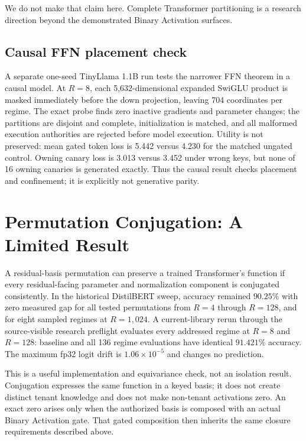 \documentclass[11pt]{article}
\begin{document}
We do not make that claim here. Complete Transformer partitioning is a research
direction beyond the demonstrated Binary Activation surfaces.

\subsection{Causal FFN placement check}

A separate one-seed TinyLlama 1.1B run tests the narrower FFN theorem in a
causal model. At $R=8$, each 5,632-dimensional expanded SwiGLU product is
masked immediately before the down projection, leaving 704 coordinates per
regime. The exact probe finds zero inactive gradients and parameter changes;
the partitions are disjoint and complete, initialization is matched, and all
malformed execution authorities are rejected before model execution. Utility is
not preserved: mean gated token loss is 5.442 versus 4.230 for the matched
ungated control. Owning canary loss is 3.013 versus 3.452 under wrong keys, but
none of 16 owning canaries is generated exactly. Thus the causal result checks
placement and confinement; it is explicitly not generative parity.

\section{Permutation Conjugation: A Limited Result}

A residual-basis permutation can preserve a trained Transformer's function if
every residual-facing parameter and normalization component is conjugated
consistently. In the historical DistilBERT sweep, accuracy remained $90.25\%$
with zero measured gap for all tested permutations from $R=4$ through $R=128$,
and for eight sampled regimes at $R=1{,}024$. A current-library rerun through
the source-visible research preflight evaluates every addressed regime at $R=8$ and $R=128$:
baseline and all 136 regime evaluations have identical $91.421\%$ accuracy.
The maximum fp32 logit drift is $1.06\times10^{-5}$ and changes no prediction.

This is a useful implementation and equivariance check, not an isolation
result. Conjugation expresses the same function in a keyed basis; it does not
create distinct tenant knowledge and does not make non-tenant activations zero.
An exact zero arises only when the authorized basis is composed with an actual
Binary Activation gate. That gated composition then inherits the same closure
requirements described above.
\end{document}
